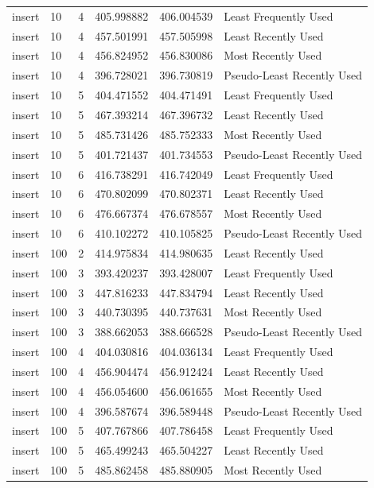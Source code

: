 \begin{tabular}{llrrrl}
insert & 10 & 4 & 405.998882 & 406.004539 & Least Frequently Used \\
insert & 10 & 4 & 457.501991 & 457.505998 & Least Recently Used \\
insert & 10 & 4 & 456.824952 & 456.830086 & Most Recently Used \\
insert & 10 & 4 & 396.728021 & 396.730819 & Pseudo-Least Recently Used \\
insert & 10 & 5 & 404.471552 & 404.471491 & Least Frequently Used \\
insert & 10 & 5 & 467.393214 & 467.396732 & Least Recently Used \\
insert & 10 & 5 & 485.731426 & 485.752333 & Most Recently Used \\
insert & 10 & 5 & 401.721437 & 401.734553 & Pseudo-Least Recently Used \\
insert & 10 & 6 & 416.738291 & 416.742049 & Least Frequently Used \\
insert & 10 & 6 & 470.802099 & 470.802371 & Least Recently Used \\
insert & 10 & 6 & 476.667374 & 476.678557 & Most Recently Used \\
insert & 10 & 6 & 410.102272 & 410.105825 & Pseudo-Least Recently Used \\
insert & 100 & 2 & 414.975834 & 414.980635 & Least Recently Used \\
insert & 100 & 3 & 393.420237 & 393.428007 & Least Frequently Used \\
insert & 100 & 3 & 447.816233 & 447.834794 & Least Recently Used \\
insert & 100 & 3 & 440.730395 & 440.737631 & Most Recently Used \\
insert & 100 & 3 & 388.662053 & 388.666528 & Pseudo-Least Recently Used \\
insert & 100 & 4 & 404.030816 & 404.036134 & Least Frequently Used \\
insert & 100 & 4 & 456.904474 & 456.912424 & Least Recently Used \\
insert & 100 & 4 & 456.054600 & 456.061655 & Most Recently Used \\
insert & 100 & 4 & 396.587674 & 396.589448 & Pseudo-Least Recently Used \\
insert & 100 & 5 & 407.767866 & 407.786458 & Least Frequently Used \\
insert & 100 & 5 & 465.499243 & 465.504227 & Least Recently Used \\
insert & 100 & 5 & 485.862458 & 485.880905 & Most Recently Used \\

\end{tabular}
